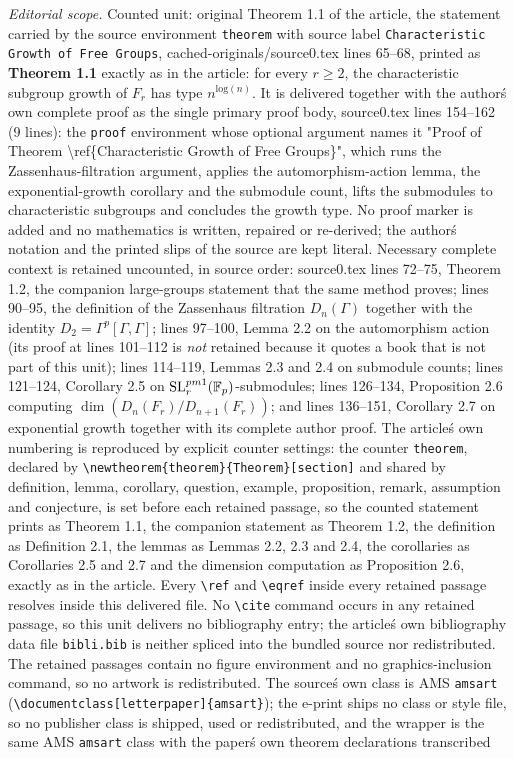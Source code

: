\documentclass[10pt,a4paper]{amsart}
\begin{document}
\noindent\textit{Editorial scope.} Counted unit: original Theorem 1.1 of the article, the statement carried by the source environment \texttt{theorem} with source label \texttt{Characteristic Growth of Free Groups}, cached-originals/source0.tex lines 65--68, printed as \textbf{Theorem 1.1} exactly as in the article: for every $r \geq 2$, the characteristic subgroup growth of $F_r$ has type $n^{\mathrm{log}(n)}$. It is delivered together with the author\'s own complete proof as the single primary proof body, source0.tex lines 154--162 (9 lines): the \texttt{proof} environment whose optional argument names it "Proof of Theorem \textbackslash ref\{Characteristic Growth of Free Groups\}", which runs the Zassenhaus-filtration argument, applies the automorphism-action lemma, the exponential-growth corollary and the submodule count, lifts the submodules to characteristic subgroups and concludes the growth type. No proof marker is added and no mathematics is written, repaired or re-derived; the author\'s notation and the printed slips of the source are kept literal. Necessary complete context is retained uncounted, in source order: source0.tex lines 72--75, Theorem 1.2, the companion large-groups statement that the same method proves; lines 90--95, the definition of the Zassenhaus filtration $D_n(\Gamma)$ together with the identity $D_2=\Gamma^p[\Gamma,\Gamma]$; lines 97--100, Lemma 2.2 on the automorphism action (its proof at lines 101--112 is \emph{not} retained because it quotes a book that is not part of this unit); lines 114--119, Lemmas 2.3 and 2.4 on submodule counts; lines 121--124, Corollary 2.5 on $\mathrm{SL}^{\\pm1}_r(\mathbb{F}_p)$-submodules; lines 126--134, Proposition 2.6 computing $\dim(D_n(F_r)/D_{n+1}(F_r))$; and lines 136--151, Corollary 2.7 on exponential growth together with its complete author proof. The article\'s own numbering is reproduced by explicit counter settings: the counter \texttt{theorem}, declared by \texttt{\textbackslash newtheorem\{theorem\}\{Theorem\}[section]} and shared by definition, lemma, corollary, question, example, proposition, remark, assumption and conjecture, is set before each retained passage, so the counted statement prints as Theorem 1.1, the companion statement as Theorem 1.2, the definition as Definition 2.1, the lemmas as Lemmas 2.2, 2.3 and 2.4, the corollaries as Corollaries 2.5 and 2.7 and the dimension computation as Proposition 2.6, exactly as in the article. Every \texttt{\textbackslash ref} and \texttt{\textbackslash eqref} inside every retained passage resolves inside this delivered file. No \texttt{\textbackslash cite} command occurs in any retained passage, so this unit delivers no bibliography entry; the article\'s own bibliography data file \texttt{bibli.bib} is neither spliced into the bundled source nor redistributed. The retained passages contain no figure environment and no graphics-inclusion command, so no artwork is redistributed. The source\'s own class is AMS \texttt{amsart} (\texttt{\textbackslash documentclass[letterpaper]\{amsart\}}); the e-print ships no class or style file, so no publisher class is shipped, used or redistributed, and the wrapper is the same AMS \texttt{amsart} class with the paper\'s own theorem declarations transcribed 
\end{document}
